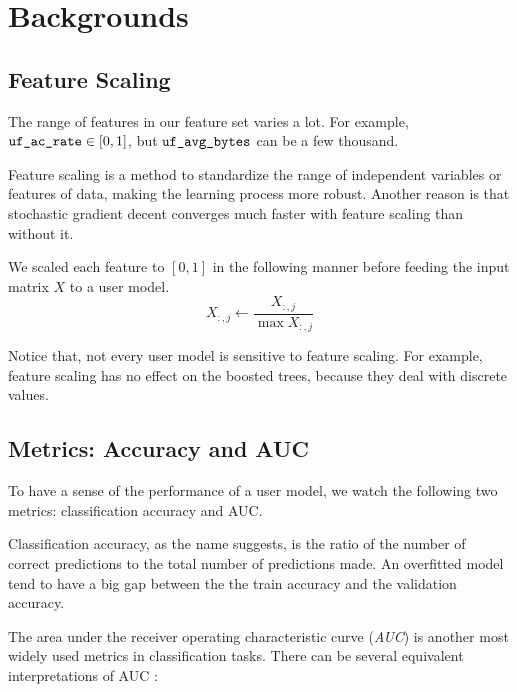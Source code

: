 \section{Backgrounds}

    \subsection{Feature Scaling}

        The range of features in our feature set varies a lot.
        For example, $\verb|uf_ac_rate| \in [0,1]$, but $\verb|uf_avg_bytes|$ can be a few thousand.

        Feature scaling is a method to standardize the range of independent variables or features of data,
        making the learning process more robust.
        Another reason is that stochastic gradient decent converges much faster with feature scaling than without it.
        \cite{ioffe_batch_2015}

        We scaled each feature to $[0,1]$ in the following manner before feeding the input matrix $X$ to a user model.
        \[
        X_{:,j} \leftarrow \frac{X_{:,j}}{\max X_{:,j}}
        \]

        Notice that, not every user model is sensitive to feature scaling.
        For example, feature scaling has no effect on the boosted trees, because they deal with discrete values.

    \subsection{Metrics: Accuracy and AUC}

        To have a sense of the performance of a user model, we watch the following two metrics:
        classification accuracy and AUC.

        Classification accuracy, as the name suggests, is the ratio of
        the number of correct predictions to the total number of predictions made.
        An overfitted model tend to have a big gap between the the train accuracy and the validation accuracy.

        The area under the receiver operating characteristic curve (\emph{AUC})
        is another most widely used metrics in classification tasks.
        There can be several equivalent interpretations of AUC \cite{flach_putting_2007}:

